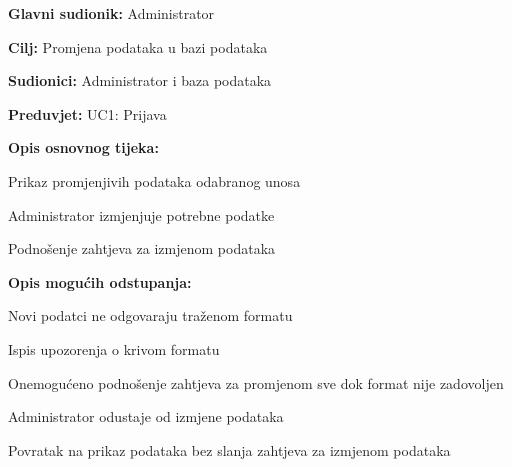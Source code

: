					\noindent {}
					\begin{packed_item}
						
						\item \textbf{Glavni sudionik: }Administrator
						\item  \textbf{Cilj:} Promjena podataka u bazi podataka
						\item  \textbf{Sudionici:} Administrator i baza podataka
						\item  \textbf{Preduvjet:} UC1: Prijava
						\item  \textbf{Opis osnovnog tijeka:}
						
						\item[] \begin{packed_enum}
							
							\item Prikaz promjenjivih podataka odabranog unosa 
							\item Administrator izmjenjuje potrebne podatke
							\item Podnošenje zahtjeva za izmjenom podataka
							
						\end{packed_enum}
						
						\item  \textbf{Opis mogućih odstupanja:}
						
						\item[] \begin{packed_item}
							
							\item[2.a] Novi podatci ne odgovaraju traženom formatu 
							\item[] \begin{packed_enum}
								
								\item Ispis upozorenja o krivom formatu
								\item Onemogućeno podnošenje zahtjeva za promjenom sve dok format nije zadovoljen
								
							\end{packed_enum}
							
							\item[3.a] Administrator odustaje od izmjene podataka
							\item[] \begin{packed_enum}
								
								\item Povratak na prikaz podataka bez slanja zahtjeva za izmjenom podataka
								
							\end{packed_enum}
							
						\end{packed_item}
					\end{packed_item}
					
